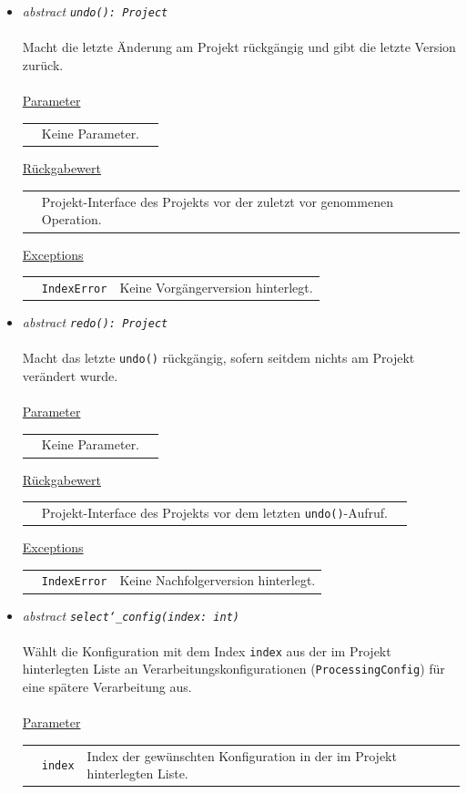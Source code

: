 \documentclass{article}
\begin{document}
\begin{itemize}
\item \textit{\flqq{}abstract\frqq} \texttt{\textit{undo(): Project}}\\\\
Macht die letzte Änderung am Projekt rückgängig und gibt die letzte Version zurück.
\\\\
\underline{Parameter}\\
\begin{tabular}{lll}
 & Keine Parameter.
\end{tabular}

\underline{Rückgabewert}\\
\begin{tabular}{lll}
 & Projekt-Interface des Projekts vor der zuletzt vor genommenen Operation.\\
\end{tabular}

\underline{Exceptions}\\
\begin{tabular}{lll}
 & \texttt{IndexError} & Keine Vorgängerversion hinterlegt.\\
\end{tabular}


\item \textit{\flqq{}abstract\frqq} \texttt{\textit{redo(): Project}}\\\\
Macht das letzte \texttt{undo()} rückgängig, sofern seitdem nichts am Projekt verändert wurde.
\\\\
\underline{Parameter}\\
\begin{tabular}{lll}
 & Keine Parameter.
\end{tabular}

\underline{Rückgabewert}\\
\begin{tabular}{lll}
 & Projekt-Interface des Projekts vor dem letzten \texttt{undo()}-Aufruf.\\
\end{tabular}

\underline{Exceptions}\\
\begin{tabular}{lll}
 & \texttt{IndexError} & Keine Nachfolgerversion hinterlegt.\\
\end{tabular}


\item \textit{\flqq{}abstract\frqq} \texttt{\textit{select\char`_config(index: int)}}\\\\
Wählt die Konfiguration mit dem Index \texttt{index} aus der im Projekt hinterlegten Liste an Verarbeitungskonfigurationen (\texttt{ProcessingConfig}) für eine spätere Verarbeitung aus.
\\\\
\underline{Parameter}\\
\begin{tabular}{lll}
 & \texttt{index} & Index der gewünschten Konfiguration in der im Projekt hinterlegten Liste.
\end{tabular}


\end{itemize}
\end{document}
